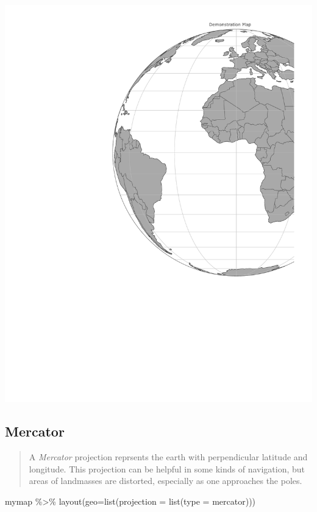 \documentclass[
  letterpaper,
  DIV=11,
  numbers=noendperiod,
  oneside]{scrreprt}
\newenvironment{Shaded}{\begin{snugshade}}{\end{snugshade}}
\newcommand{\AttributeTok}[1]{\textcolor[rgb]{0.40,0.45,0.13}{#1}}
\newcommand{\FunctionTok}[1]{\textcolor[rgb]{0.28,0.35,0.67}{#1}}
\newcommand{\NormalTok}[1]{\textcolor[rgb]{0.00,0.23,0.31}{#1}}
\newcommand{\SpecialCharTok}[1]{\textcolor[rgb]{0.37,0.37,0.37}{#1}}
\newcommand{\StringTok}[1]{\textcolor[rgb]{0.13,0.47,0.30}{#1}}
\begin{document}
\includegraphics{projections_files/figure-pdf/unnamed-chunk-5-1.pdf}

\subsection{Mercator}\label{mercator}

\begin{quote}
A \emph{Mercator} projection reprsents the earth with perpendicular
latitude and longitude. This projection can be helpful in some kinds of
navigation, but areas of landmasses are distorted, especially as one
approaches the poles.
\end{quote}

\begin{Shaded}
\begin{Highlighting}[]
\NormalTok{mymap }\SpecialCharTok{\%\textgreater{}\%} 
  \FunctionTok{layout}\NormalTok{(}\AttributeTok{geo=}\FunctionTok{list}\NormalTok{(}\AttributeTok{projection =} \FunctionTok{list}\NormalTok{(}\AttributeTok{type =} \StringTok{\textquotesingle{}mercator\textquotesingle{}}\NormalTok{)))}
\end{Highlighting}
\end{Shaded}
\end{document}
